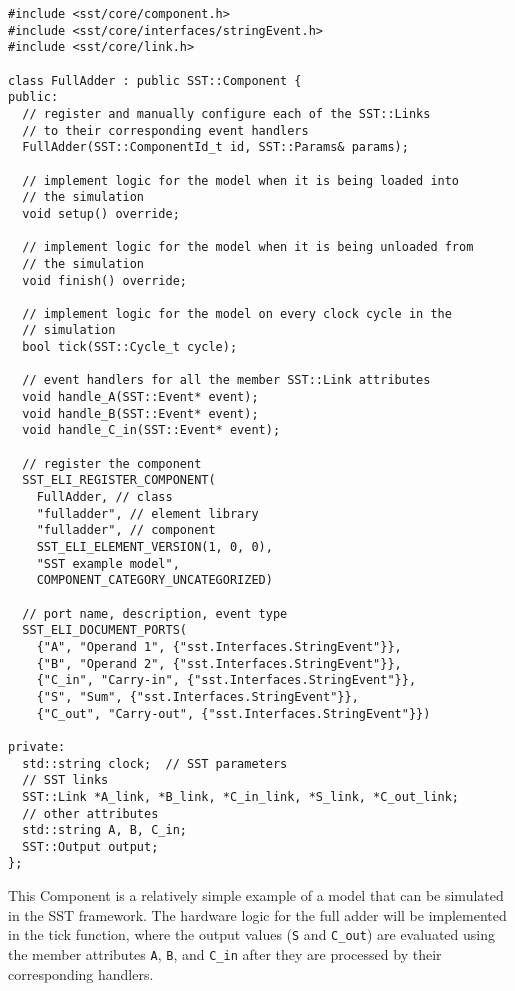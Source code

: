 \newpage
\begin{lstlisting}[style=customC++,label=currentModel,caption=Example Interface of an SST Component Model]
#include <sst/core/component.h>
#include <sst/core/interfaces/stringEvent.h>
#include <sst/core/link.h>

class FullAdder : public SST::Component {
public:
  // register and manually configure each of the SST::Links
  // to their corresponding event handlers
  FullAdder(SST::ComponentId_t id, SST::Params& params);

  // implement logic for the model when it is being loaded into
  // the simulation
  void setup() override;

  // implement logic for the model when it is being unloaded from
  // the simulation
  void finish() override;

  // implement logic for the model on every clock cycle in the
  // simulation
  bool tick(SST::Cycle_t cycle);

  // event handlers for all the member SST::Link attributes
  void handle_A(SST::Event* event);
  void handle_B(SST::Event* event);
  void handle_C_in(SST::Event* event);

  // register the component
  SST_ELI_REGISTER_COMPONENT(
    FullAdder, // class
    "fulladder", // element library
    "fulladder", // component
    SST_ELI_ELEMENT_VERSION(1, 0, 0),
    "SST example model",
    COMPONENT_CATEGORY_UNCATEGORIZED)

  // port name, description, event type
  SST_ELI_DOCUMENT_PORTS(
    {"A", "Operand 1", {"sst.Interfaces.StringEvent"}},
    {"B", "Operand 2", {"sst.Interfaces.StringEvent"}},
    {"C_in", "Carry-in", {"sst.Interfaces.StringEvent"}},
    {"S", "Sum", {"sst.Interfaces.StringEvent"}},
    {"C_out", "Carry-out", {"sst.Interfaces.StringEvent"}})

private:
  std::string clock;  // SST parameters
  // SST links
  SST::Link *A_link, *B_link, *C_in_link, *S_link, *C_out_link;
  // other attributes
  std::string A, B, C_in;
  SST::Output output;
};
\end{lstlisting}
\newpage

This Component is a relatively simple example of a model that can be simulated in the SST framework. The hardware logic for the full adder will be implemented in the tick function, where the output values (\texttt{S} and \texttt{C\_out}) are evaluated using the member attributes \texttt{A}, \texttt{B}, and \texttt{C\_in} after they are processed by their corresponding handlers.

